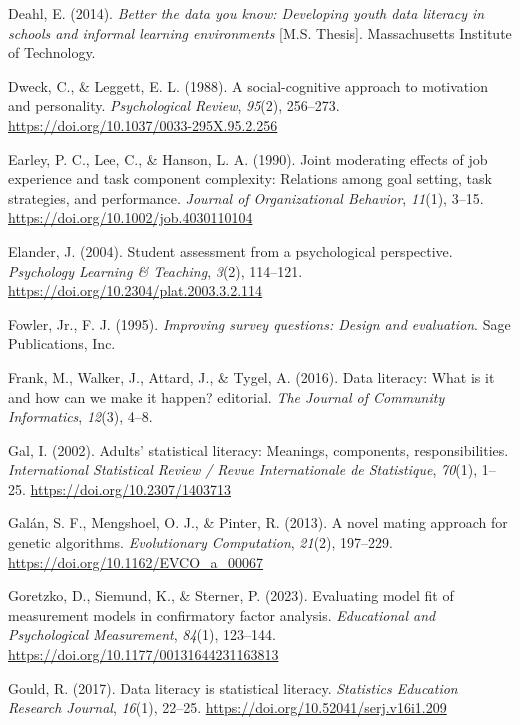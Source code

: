 \documentclass[
  12pt,
  a4paper,
  twoside]{article}
\newlength{\cslhangindent}
\newenvironment{CSLReferences}[2] %
 {\begin{list}{}{%
  \setlength{\itemindent}{0pt}
  \setlength{\leftmargin}{0pt}
  \setlength{\parsep}{0pt}
  \ifodd #1
   \setlength{\leftmargin}{\cslhangindent}
   \setlength{\itemindent}{-1\cslhangindent}
  \fi
  \setlength{\itemsep}{#2\baselineskip}}}
 {\end{list}}
\begin{document}
\begin{CSLReferences}{1}{0}
Deahl, E. (2014). \emph{Better the data you know: Developing youth data literacy in schools and informal learning environments} {[}M.S. Thesis{]}. Massachusetts Institute of Technology.

Dweck, C., \& Leggett, E. L. (1988). A social-cognitive approach to motivation and personality. \emph{Psychological Review}, \emph{95}(2), 256--273. \url{https://doi.org/10.1037/0033-295X.95.2.256}

Earley, P. C., Lee, C., \& Hanson, L. A. (1990). Joint moderating effects of job experience and task component complexity: Relations among goal setting, task strategies, and performance. \emph{Journal of Organizational Behavior}, \emph{11}(1), 3--15. \url{https://doi.org/10.1002/job.4030110104}

Elander, J. (2004). Student assessment from a psychological perspective. \emph{Psychology Learning \& Teaching}, \emph{3}(2), 114--121. \url{https://doi.org/10.2304/plat.2003.3.2.114}

Fowler, Jr., F. J. (1995). \emph{Improving survey questions: Design and evaluation}. Sage Publications, Inc.

Frank, M., Walker, J., Attard, J., \& Tygel, A. (2016). Data literacy: What is it and how can we make it happen? editorial. \emph{The Journal of Community Informatics}, \emph{12}(3), 4--8.

Gal, I. (2002). Adults' statistical literacy: Meanings, components, responsibilities. \emph{International Statistical Review / Revue Internationale de Statistique}, \emph{70}(1), 1--25. \url{https://doi.org/10.2307/1403713}

Galán, S. F., Mengshoel, O. J., \& Pinter, R. (2013). A novel mating approach for genetic algorithms. \emph{Evolutionary Computation}, \emph{21}(2), 197--229. \url{https://doi.org/10.1162/EVCO_a_00067}

Goretzko, D., Siemund, K., \& Sterner, P. (2023). Evaluating model fit of measurement models in confirmatory factor analysis. \emph{Educational and Psychological Measurement}, \emph{84}(1), 123--144. \url{https://doi.org/10.1177/00131644231163813}

Gould, R. (2017). Data literacy is statistical literacy. \emph{Statistics Education Research Journal}, \emph{16}(1), 22--25. \url{https://doi.org/10.52041/serj.v16i1.209}


\end{CSLReferences}
\end{document}
